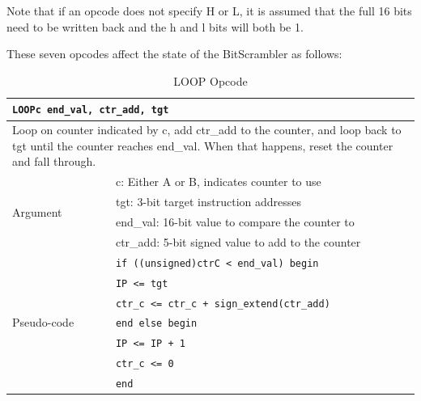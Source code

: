 \documentclass[main\_\_EN.tex]{subfiles}
\begin{document}
Note that if an opcode does not specify H or L, it is assumed that the full 16 bits need to be written back and the h and l bits will both be 1.

These seven opcodes affect the state of the BitScrambler as follows:

\begin{table}[H]
\caption{LOOP Opcode}
\label{tab:bitscrm-loop-opcode}
\begin{tabular}{|l|l|}
\hline
\multicolumn{2}{|l|}{\texttt{LOOPc end\_val, ctr\_add, tgt}} \\
\hline
\multicolumn{2}{|L{17cm}|}{Loop on counter indicated by c, add ctr\_add to the counter, and loop back to tgt until the counter reaches end\_val. When that happens, reset the counter and fall through.} \\
\hline
\multirow{4}{*}{Argument} & c: Either A or B, indicates counter to use \\
& tgt: 3-bit target instruction addresses \\
& end\_val: 16-bit value to compare the counter to \\
& ctr\_add: 5-bit signed value to add to the counter \\
\hline
\multirow{7}{*}{Pseudo-code} & \texttt{if ((unsigned)ctrC < end\_val) begin} \\
& \hspace*{4mm} \texttt{IP <= tgt} \\
& \hspace*{4mm} \texttt{ctr\_c <= ctr\_c + sign\_extend(ctr\_add)} \\
& \texttt{end else begin} \\
& \hspace*{4mm} \texttt{IP <= IP + 1} \\
& \hspace*{4mm} \texttt{ctr\_c <= 0} \\
& \texttt{end} \\
\hline
\end{tabular}
\end{table}
\end{document}
